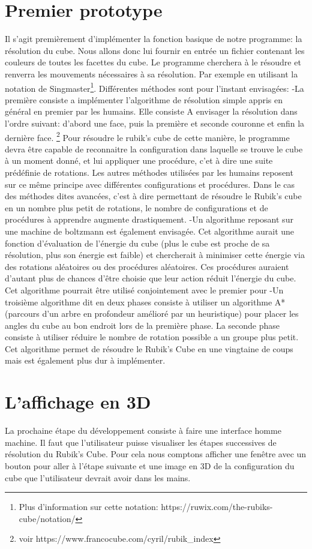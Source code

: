 \documentclass[a4paper]{report}
\begin{document}
\section{Premier prototype}
Il s'agit premièrement d'implémenter la fonction basique de notre programme: la résolution du cube. Nous allons donc lui fournir en entrée un fichier contenant les couleurs de toutes les facettes du cube. Le programme cherchera à le résoudre et renverra les mouvements nécessaires à sa résolution. Par exemple en utilisant la notation de Singmaster\footnote{Plus d'information sur cette notation: https://ruwix.com/the-rubiks-cube/notation/}.
Différentes méthodes sont pour l'instant envisagées:
	-La première consiste a implémenter l'algorithme de résolution simple appris en général en premier par les humains. Elle consiste A envisager la résolution dans l'ordre suivant: d'abord une face, puis la première et seconde couronne et enfin la dernière face. \footnote {voir https://www.francocube.com/cyril/rubik_index} Pour résoudre le rubik's cube de cette manière, le programme devra être capable de reconnaitre la configuration dans laquelle se trouve le cube à un moment donné, et lui appliquer une procédure, c'et à dire une suite prédéfinie de rotations. Les autres méthodes utilisées par les humains reposent sur ce même principe avec différentes configurations et procédures. Dans le cas des méthodes dites avancées, c'est à dire permettant de résoudre le Rubik's cube en un nombre plus petit de rotations, le nombre de configurations et de procédures à apprendre augmente drastiquement.
	-Un algorithme reposant sur une machine de boltzmann est également envisagée. Cet algorithme aurait une fonction d'évaluation de l'énergie du cube (plus le cube est proche de sa résolution, plus son énergie est faible) et chercherait à minimiser cette énergie via des rotations aléatoires ou des procédures aléatoires. Ces procédures auraient d'autant plus de chances d'être choisie que leur action réduit l'énergie du cube. Cet algorithme pourrait être utilisé conjointement avec le premier pour 
	-Un troisième algorithme dit en deux phases consiste à utiliser un algorithme A*(parcours d'un arbre en profondeur amélioré par un heuristique) pour placer les angles du cube au bon endroit lors de la première phase. La seconde phase consiste à utiliser réduire le nombre de rotation possible a un groupe plus petit. Cet algorithme permet de résoudre le Rubik's Cube en une vingtaine de coups mais est également plus dur à implémenter.

\section{L'affichage en 3D}
La prochaine étape du développement consiste à faire une interface homme machine. Il faut que l'utilisateur puisse visualiser les étapes successives de résolution du Rubik's Cube. Pour cela nous comptons afficher une fenêtre avec un bouton pour aller à l'étape suivante et une image en 3D de la configuration du cube que l'utilisateur devrait avoir dans les mains.
\end{document}
